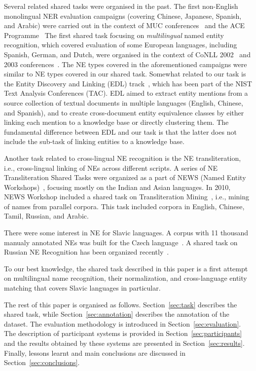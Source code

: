 \documentclass[11pt]{article}
\begin{document}
Several related shared tasks were organised in the past. The first non-English monolingual
NER evaluation campaigns (covering Chinese, Japanese, Spanish, and Arabic) were carried out in the 
context of MUC conferences~\cite{chinchor:98} and the ACE Programme~\cite{conf/lrec/DoddingtonMPRSW04}
The first shared task focusing on \emph{multilingual} named entity recognition, which covered evaluation of
some European languages, including Spanish, German, and Dutch, were organised in the context of
CoNLL 2002~\cite{TjongKimSang:2002:ICS:1118853.1118877} and 2003 conferences~\cite{TjongKimSang:2003:ICS:1119176.1119195}.
The NE types covered in the aforementioned campaigns were similar to NE types covered in our
shared task. Somewhat related to our task is the Entity Discovery and Linking (EDL) track~\cite{ji:ea:2014,ji:ea:2015}, which has been part of the NIST Text Analysis Conferences (TAC). EDL aimed to extract entity mentions 
from a source collection of textual documents in multiple languages (English, Chinese, and Spanish), 
and to create cross-document entity equivalence classes by either linking each mention to a knowledge base or
directly clustering them. The fundamental difference between EDL and our task
is that the latter does not include the sub-task of linking entities to a knowledge base. 

Another task related to cross-lingual NE recognition is the NE
transliteration, i.e., cross-lingual linking of NEs across different
scripts. A series of NE Transliteration Shared Tasks were organized as a part of
NEWS (Named Entity Workshops)~\cite{duan2016report}, focusing mostly on the Indian and Asian languages. In 2010, NEWS Workshop
included a shared task on Transliteration
Mining~\cite{kumaran2010report}, i.e., mining of names from parallel
corpora. This task included corpora in English, Chinese, Tamil,
Russian, and Arabic.

There were some interest in NE for Slavic languages. A corpus with
11 thousand manualy annotated NEs was built for the Czech
language~\cite{vsevvcikova2007named}. A shared task on Russian NE
Recognition has been organized recently~\cite{alexeeva2016factrueval}.

To our best knowledge, the shared task described in this paper is a
first attempt on multilingual name recognition, their normalization, 
and cross-language entity matching that covers Slavic languages in
particular.

The rest of this paper is organised as follows. Section~\ref{sec:task}
describes the shared task, while Section~\ref{sec:annotation} describes the
annotation of the dataset.  The evaluation methodology is
introduced in Section~\ref{sec:evaluation}.  The description of participant
systems is provided in Section~\ref{sec:participants} and the results obtained
by these systems are presented in Section~\ref{sec:results}.  Finally, lessons
learnt and main conclusions are discussed in Section~\ref{sec:conclusions}.
\end{document}

